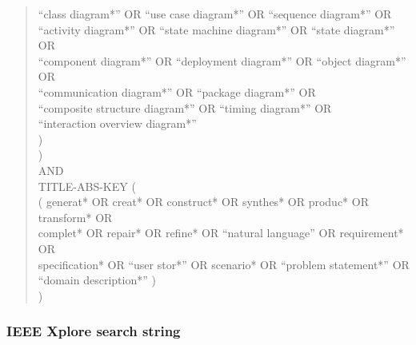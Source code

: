 \begin{quote}
\begin{minipage}{0.96\textwidth}
\qquad ``class diagram*'' OR ``use case diagram*'' OR ``sequence diagram*'' OR\\
\qquad ``activity diagram*'' OR ``state machine diagram*'' OR ``state diagram*'' OR\\
\qquad ``component diagram*'' OR ``deployment diagram*'' OR ``object diagram*'' OR\\
\qquad ``communication diagram*'' OR ``package diagram*'' OR\\
\qquad ``composite structure diagram*'' OR ``timing diagram*'' OR\\
\qquad ``interaction overview diagram*''\\
\quad )\\
)\\
AND\\
TITLE-ABS-KEY (\\
\quad ( generat* OR creat* OR construct* OR synthes* OR produc* OR transform* OR\\
\quad complet* OR repair* OR refine* OR ``natural language'' OR requirement* OR\\
\quad specification* OR ``user stor*'' OR scenario* OR ``problem statement*'' OR\\
\quad ``domain description*'' )\\
)
\end{minipage}
\end{quote}

\subsubsection{IEEE Xplore search string}

